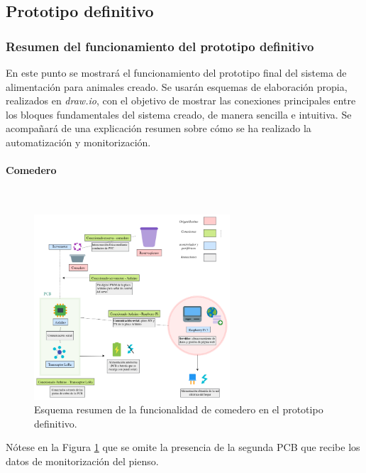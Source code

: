 \documentclass[12pt]{article}
\newcommand{\subsubsubsection}[1]{\paragraph{#1}\mbox{}\\}
\begin{document}
	\pagebreak
	
	\subsection[Prototipo definitivo]{Prototipo definitivo}
	
	\subsubsection{Resumen del funcionamiento del prototipo definitivo}
	\label{subsubsection: resumen funcionamiento prototipo definitivo}
	
	\noindent En este punto se mostrará el funcionamiento del prototipo final del sistema de alimentación para animales creado. Se usarán esquemas de elaboración propia, realizados en \textit{draw.io}, con el objetivo de mostrar las conexiones principales entre los bloques fundamentales del sistema creado, de manera sencilla e intuitiva. Se acompañará de una explicación resumen  sobre cómo se ha realizado la automatización y monitorización.
		
	\subsubsubsection{Comedero}

	\begin{figure}[h!]
		\begin{center}
			\includegraphics[width=0.65\textwidth]{img/conexiones tfg-comedero.png}
			\caption{Esquema resumen de la funcionalidad de comedero en el prototipo definitivo.}
			\label{Conexiones TFG comedero.}
		\end{center}
	\end{figure}
	
	\noindent Nótese en la Figura \ref{Conexiones TFG comedero.} que se omite la presencia de la segunda PCB que recibe los datos de monitorización del pienso.  \\
	
\end{document}
